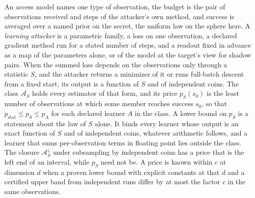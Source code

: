\begin{definition}
An access model names one type of observation, the budget is the pair of observations
received and steps of the attacker's own method, and success is averaged over a named
prior on the secret, the uniform law on the sphere here. A \emph{learning attacker} is
a parametric family, a loss on one observation, a declared gradient method run for a
stated number of steps, and a readout fixed in advance as a map of the parameters
alone, or of the model at the target's view for shadow pairs. When the summed loss
depends on the observations only through a statistic $S$, and the attacker returns a
minimizer of it or runs full-batch descent from a fixed start, its output is a function
of $S$ and of independent coins. The class $\mathcal A_S$ holds every estimator of that
form, and its price $p_S(s_0)$ is the least number of observations at which some member
reaches success $s_0$, so that $p_{\mathrm{stat}}\le p_S\le p_A$ for each declared
learner $A$ in the class. A lower bound on $p_S$ is a statement about the law of $S$
alone. It binds every learner whose output is an exact function of $S$ and of
independent coins, whatever arithmetic follows, and a learner that sums per-observation
terms in floating point lies outside the class. The closure $\mathcal A_S^\downarrow$
under subsampling by independent coins has a price that is the left end of an interval,
while $p_S$ need not be. A price is known within $c$ at dimension $d$ when a proven
lower bound with explicit constants at that $d$ and a certified upper band from
independent runs differ by at most the factor $c$ in the same observations.
\end{definition}
